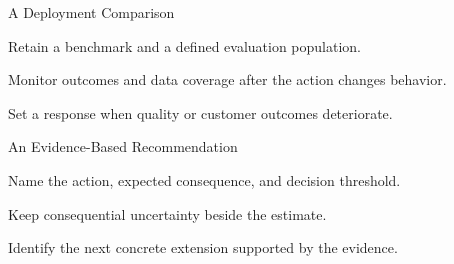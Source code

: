 \begin{frame}{A Deployment Comparison}
\vfill
\begin{slidebullets}
\item Retain a benchmark and a defined evaluation population.
\item Monitor outcomes and data coverage after the action changes behavior.
\item Set a response when quality or customer outcomes deteriorate.
\end{slidebullets}
\vfill
{}
\end{frame}
\begin{frame}{An Evidence-Based Recommendation}
\vfill
\begin{slidebullets}
\item Name the action, expected consequence, and decision threshold.
\item Keep consequential uncertainty beside the estimate.
\item Identify the next concrete extension supported by the evidence.
\end{slidebullets}
\vfill
{}
\end{frame}

